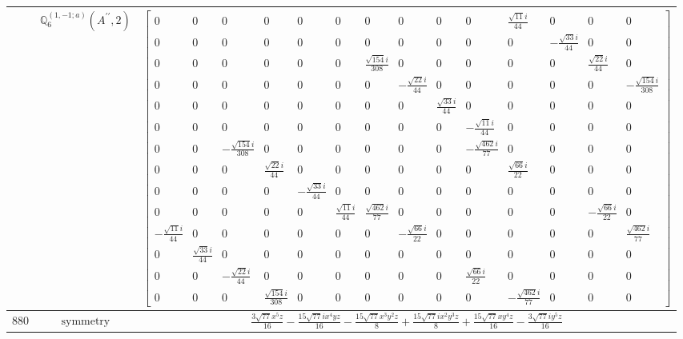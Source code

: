 \documentclass[fleqn,8pt,landscape]{jsarticle}
\begin{document}
\begin{longtable}{ccc}
$  $ & $ \mathbb{Q}_{6}^{(1,-1;a)}(A^{\prime\prime},2) $ & $ \begin{bmatrix} 0 & 0 & 0 & 0 & 0 & 0 & 0 & 0 & 0 & 0 & \frac{\sqrt{11} i}{44} & 0 & 0 & 0 \\ 0 & 0 & 0 & 0 & 0 & 0 & 0 & 0 & 0 & 0 & 0 & - \frac{\sqrt{33} i}{44} & 0 & 0 \\ 0 & 0 & 0 & 0 & 0 & 0 & \frac{\sqrt{154} i}{308} & 0 & 0 & 0 & 0 & 0 & \frac{\sqrt{22} i}{44} & 0 \\ 0 & 0 & 0 & 0 & 0 & 0 & 0 & - \frac{\sqrt{22} i}{44} & 0 & 0 & 0 & 0 & 0 & - \frac{\sqrt{154} i}{308} \\ 0 & 0 & 0 & 0 & 0 & 0 & 0 & 0 & \frac{\sqrt{33} i}{44} & 0 & 0 & 0 & 0 & 0 \\ 0 & 0 & 0 & 0 & 0 & 0 & 0 & 0 & 0 & - \frac{\sqrt{11} i}{44} & 0 & 0 & 0 & 0 \\ 0 & 0 & - \frac{\sqrt{154} i}{308} & 0 & 0 & 0 & 0 & 0 & 0 & - \frac{\sqrt{462} i}{77} & 0 & 0 & 0 & 0 \\ 0 & 0 & 0 & \frac{\sqrt{22} i}{44} & 0 & 0 & 0 & 0 & 0 & 0 & \frac{\sqrt{66} i}{22} & 0 & 0 & 0 \\ 0 & 0 & 0 & 0 & - \frac{\sqrt{33} i}{44} & 0 & 0 & 0 & 0 & 0 & 0 & 0 & 0 & 0 \\ 0 & 0 & 0 & 0 & 0 & \frac{\sqrt{11} i}{44} & \frac{\sqrt{462} i}{77} & 0 & 0 & 0 & 0 & 0 & - \frac{\sqrt{66} i}{22} & 0 \\ - \frac{\sqrt{11} i}{44} & 0 & 0 & 0 & 0 & 0 & 0 & - \frac{\sqrt{66} i}{22} & 0 & 0 & 0 & 0 & 0 & \frac{\sqrt{462} i}{77} \\ 0 & \frac{\sqrt{33} i}{44} & 0 & 0 & 0 & 0 & 0 & 0 & 0 & 0 & 0 & 0 & 0 & 0 \\ 0 & 0 & - \frac{\sqrt{22} i}{44} & 0 & 0 & 0 & 0 & 0 & 0 & \frac{\sqrt{66} i}{22} & 0 & 0 & 0 & 0 \\ 0 & 0 & 0 & \frac{\sqrt{154} i}{308} & 0 & 0 & 0 & 0 & 0 & 0 & - \frac{\sqrt{462} i}{77} & 0 & 0 & 0 \end{bmatrix} $ \\ \hline
$ 880 $ & $ \text{symmetry} $ & $ \frac{3 \sqrt{77} x^{5} z}{16} - \frac{15 \sqrt{77} i x^{4} y z}{16} - \frac{15 \sqrt{77} x^{3} y^{2} z}{8} + \frac{15 \sqrt{77} i x^{2} y^{3} z}{8} + \frac{15 \sqrt{77} x y^{4} z}{16} - \frac{3 \sqrt{77} i y^{5} z}{16} $ \\

\end{longtable}
\end{document}
